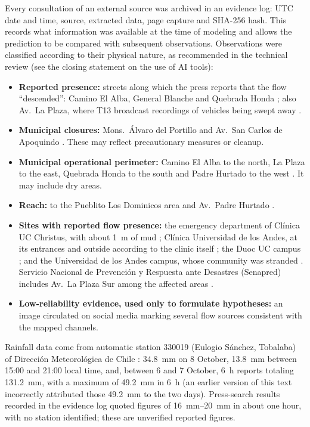 Every consultation of an external source was archived in an evidence log: UTC date and time, source, extracted data, page capture and SHA-256 hash. This records what information was available at the time of modeling and allows the prediction to be compared with subsequent observations. Observations were classified according to their physical nature, as recommended in the technical review (see the closing statement on the use of AI tools):
\begin{itemize}
\item \textbf{Reported presence:} streets along which the press reports that the flow ``descended'': Camino El Alba, General Blanche and Quebrada Honda \citep{latercera2026}; also Av.\ La Plaza, where T13 broadcast recordings of vehicles being swept away \citep{t13_2026vehiculos}.
\item \textbf{Municipal closures:} Mons.\ Álvaro del Portillo and Av.\ San Carlos de Apoquindo \citep{eldinamo2026}. These may reflect precautionary measures or cleanup.
\item \textbf{Municipal operational perimeter:} Camino El Alba to the north, La Plaza to the east, Quebrada Honda to the south and Padre Hurtado to the west \citep{latercera2026}. It may include dry areas.
\item \textbf{Reach:} to the Pueblito Los Dominicos area and Av.\ Padre Hurtado \citep{latercera2026}.
\item \textbf{Sites with reported flow presence:} the emergency department of Clínica UC Christus, with about \SI{1}{m} of mud \citep{cadena3_2026}; Clínica Universidad de los Andes, at its entrances and outside according to the clinic itself \citep{radiolasenal2026}; the Duoc UC campus \citep{biobio2026duoc}; and the Universidad de los Andes campus, whose community was stranded \citep{cooperativa2026}. Servicio Nacional de Prevención y Respuesta ante Desastres (Senapred) includes Av.\ La Plaza Sur among the affected areas \citep{eldinamo2026}.
\item \textbf{Low-reliability evidence, used only to formulate hypotheses:} an image circulated on social media marking several flow sources consistent with the mapped channels.
\end{itemize}
Rainfall data come from automatic station 330019 (Eulogio Sánchez, Tobalaba) of Dirección Meteorológica de Chile \citeyearpar{dmc2026}: \SI{34.8}{mm} on 8 October, \SI{13.8}{mm} between 15:00 and 21:00 local time, and, between 6 and 7 October, \SI{6}{h} reports totaling \SI{131.2}{mm}, with a maximum of \SI{49.2}{mm} in \SI{6}{h} (an earlier version of this text incorrectly attributed those \SI{49.2}{mm} to the two days). Press-search results recorded in the evidence log quoted figures of \SIrange{16}{20}{mm} in about one hour, with no station identified; these are unverified reported figures.

